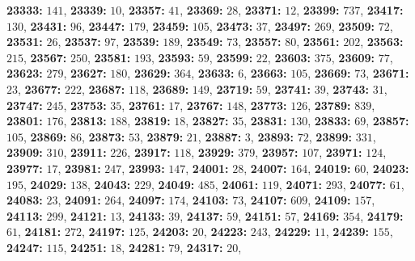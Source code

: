 \textsf{\bfseries 23333:} $141$, \textsf{\bfseries 23339:} $10$, \textsf{\bfseries 23357:} $41$, \textsf{\bfseries 23369:} $28$, \textsf{\bfseries 23371:} $12$, \textsf{\bfseries 23399:} $737$, \textsf{\bfseries 23417:} $130$, \textsf{\bfseries 23431:} $96$, \textsf{\bfseries 23447:} $179$, \textsf{\bfseries 23459:} $105$, \textsf{\bfseries 23473:} $37$, \textsf{\bfseries 23497:} $269$, \textsf{\bfseries 23509:} $72$, \textsf{\bfseries 23531:} $26$, \textsf{\bfseries 23537:} $97$, \textsf{\bfseries 23539:} $189$, \textsf{\bfseries 23549:} $73$, \textsf{\bfseries 23557:} $80$, \textsf{\bfseries 23561:} $202$, \textsf{\bfseries 23563:} $215$, \textsf{\bfseries 23567:} $250$, \textsf{\bfseries 23581:} $193$, \textsf{\bfseries 23593:} $59$, \textsf{\bfseries 23599:} $22$, \textsf{\bfseries 23603:} $375$, \textsf{\bfseries 23609:} $77$, \textsf{\bfseries 23623:} $279$, \textsf{\bfseries 23627:} $180$, \textsf{\bfseries 23629:} $364$, \textsf{\bfseries 23633:} $6$, \textsf{\bfseries 23663:} $105$, \textsf{\bfseries 23669:} $73$, \textsf{\bfseries 23671:} $23$, \textsf{\bfseries 23677:} $222$, \textsf{\bfseries 23687:} $118$, \textsf{\bfseries 23689:} $149$, \textsf{\bfseries 23719:} $59$, \textsf{\bfseries 23741:} $39$, \textsf{\bfseries 23743:} $31$, \textsf{\bfseries 23747:} $245$, \textsf{\bfseries 23753:} $35$, \textsf{\bfseries 23761:} $17$, \textsf{\bfseries 23767:} $148$, \textsf{\bfseries 23773:} $126$, \textsf{\bfseries 23789:} $839$, \textsf{\bfseries 23801:} $176$, \textsf{\bfseries 23813:} $188$, \textsf{\bfseries 23819:} $18$, \textsf{\bfseries 23827:} $35$, \textsf{\bfseries 23831:} $130$, \textsf{\bfseries 23833:} $69$, \textsf{\bfseries 23857:} $105$, \textsf{\bfseries 23869:} $86$, \textsf{\bfseries 23873:} $53$, \textsf{\bfseries 23879:} $21$, \textsf{\bfseries 23887:} $3$, \textsf{\bfseries 23893:} $72$, \textsf{\bfseries 23899:} $331$, \textsf{\bfseries 23909:} $310$, \textsf{\bfseries 23911:} $226$, \textsf{\bfseries 23917:} $118$, \textsf{\bfseries 23929:} $379$, \textsf{\bfseries 23957:} $107$, \textsf{\bfseries 23971:} $124$, \textsf{\bfseries 23977:} $17$, \textsf{\bfseries 23981:} $247$, \textsf{\bfseries 23993:} $147$, \textsf{\bfseries 24001:} $28$, \textsf{\bfseries 24007:} $164$, \textsf{\bfseries 24019:} $60$, \textsf{\bfseries 24023:} $195$, \textsf{\bfseries 24029:} $138$, \textsf{\bfseries 24043:} $229$, \textsf{\bfseries 24049:} $485$, \textsf{\bfseries 24061:} $119$, \textsf{\bfseries 24071:} $293$, \textsf{\bfseries 24077:} $61$, \textsf{\bfseries 24083:} $23$, \textsf{\bfseries 24091:} $264$, \textsf{\bfseries 24097:} $174$, \textsf{\bfseries 24103:} $73$, \textsf{\bfseries 24107:} $609$, \textsf{\bfseries 24109:} $157$, \textsf{\bfseries 24113:} $299$, \textsf{\bfseries 24121:} $13$, \textsf{\bfseries 24133:} $39$, \textsf{\bfseries 24137:} $59$, \textsf{\bfseries 24151:} $57$, \textsf{\bfseries 24169:} $354$, \textsf{\bfseries 24179:} $61$, \textsf{\bfseries 24181:} $272$, \textsf{\bfseries 24197:} $125$, \textsf{\bfseries 24203:} $20$, \textsf{\bfseries 24223:} $243$, \textsf{\bfseries 24229:} $11$, \textsf{\bfseries 24239:} $155$, \textsf{\bfseries 24247:} $115$, \textsf{\bfseries 24251:} $18$, \textsf{\bfseries 24281:} $79$, \textsf{\bfseries 24317:} $20$, 
